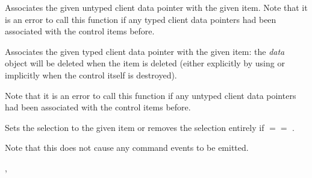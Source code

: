 
Associates the given untyped client data pointer with the given item. Note that
it is an error to call this function if any typed client data pointers had been
associated with the control items before.





\label{wxcontrolwithitemssetclientobject}


Associates the given typed client data pointer with the given item: the 
{\it data} object will be deleted when the item is deleted (either explicitly
by using  or implicitly when the
control itself is destroyed).

Note that it is an error to call this function if any untyped client data
pointers had been associated with the control items before.





\label{wxcontrolwithitemssetselection}


Sets the selection to the given item  or removes the selection entirely
if  $==$ .

Note that this does not cause any command events to be emitted.




,\rtfsp
{}


\label{wxcontrolwithitemssetstring}


